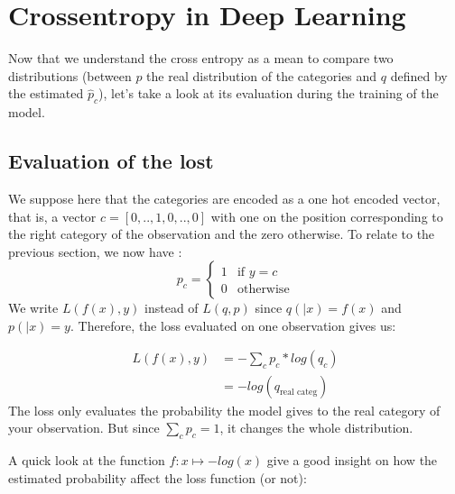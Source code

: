 \documentclass[11pt]{article}
\begin{document}
\section{Crossentropy in Deep Learning}

Now that we understand the cross entropy as a mean to compare two distributions (between $p$ the real distribution of the categories and $q$ defined by the estimated $\hat{p}_c$), let's take a look at its evaluation during the training of the model.

\subsection{Evaluation of the lost}
We suppose here that the categories are encoded as a one hot encoded vector, that is,
a vector $c = [0,..,1,0,..,0]$ with one on the position corresponding to the right category of the observation and the zero otherwise. To relate to the previous section, we now have :
$$
p_c = \left\{
    \begin{array}{ll}
        1 & \mbox{if }  y = c \\
        0 & \mbox{otherwise}
    \end{array}
\right.
$$
We write ${L(f(x) , y) }$ instead of ${L(q,p)}$ since $q(|x) = f(x)$ and $ p(|x) = y$. Therefore, the loss evaluated on one observation gives us:
\begin{equation}
\end{equation}

\begin{equation} \label{eq1}
\begin{split}
    {L(f(x) , y) } & = - \sum_c p_c * log( q_c)\\
     & =  - log( q_{\text{real categ}})
\end{split}
\end{equation}
The loss only evaluates the probability the model gives to the real category of your observation. But since $\sum_c p_c = 1 $, it changes the whole distribution. \par
A quick look at the function $f : x \mapsto - log(x) $ give a good insight on how the estimated probability affect the loss function (or not): 
\end{document}
